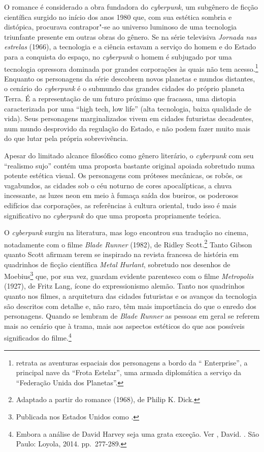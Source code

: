 O romance é considerado a obra fundadora do \emph{cyberpunk}, um
subgênero de ficção científica surgido no início dos anos 1980 que, com
sua estética sombria e distópica, procurava contrapor"-se ao universo
luminoso de uma tecnologia triunfante presente em outras obras do
gênero. Se na série televisiva \emph{Jornada nas estrelas} (1966), a
tecnologia e a ciência estavam a serviço do homem e do Estado para a
conquista do espaço, no \emph{cyberpunk} o homem é subjugado por uma
tecnologia opressora dominada por grandes corporações às quais não tem
acesso.\footnote{{} retrata as aventuras
  espaciais dos personagens a bordo da `` Enterprise'', a principal
  nave da ``Frota Estelar'', uma armada diplomática a serviço da
  ``Federação Unida dos Planetas''.} Enquanto os personagens da série
descobrem novos planetas e mundos distantes, o cenário do
\emph{cyberpunk} é o submundo das grandes cidades do próprio planeta
Terra. É a representação de um futuro próximo que fracassa, uma distopia
caracterizada por uma ``high tech, low life'' (alta tecnologia, baixa
qualidade de vida). Seus personagens marginalizados vivem em cidades
futuristas decadentes, num mundo desprovido da regulação do Estado, e
não podem fazer muito mais do que lutar pela própria sobrevivência.

Apesar do limitado alcance filosófico como gênero literário, o
\emph{cyberpunk} com seu ``realismo sujo'' contém uma proposta bastante
original apoiada sobretudo numa potente estética visual. Os personagens
com próteses mecânicas, os robôs, os vagabundos, as cidades sob o céu
noturno de cores apocalípticas, a chuva incessante, as luzes neon em
meio à fumaça saída dos bueiros, os poderosos edifícios das corporações,
as referências à cultura oriental, tudo isso é mais significativo no
\emph{cyberpunk} do que uma proposta propriamente teórica.

O \emph{cyberpunk} surgiu na literatura, mas logo encontrou sua tradução
no cinema, notadamente com o filme \emph{Blade Runner} (1982), de Ridley
Scott.\footnote{Adaptado a partir do romance {} (1968), de Philip K. Dick.} Tanto Gibson quanto
Scott afirmam terem se inspirado na revista francesa de história em
quadrinhos de ficção científica \emph{Metal Hurlant}, sobretudo nos
desenhos de Moebius\footnote{Publicada nos Estados Unidos como
  {.}} que, por sua vez, guardam evidente parentesco com
o filme \emph{Metropolis} (1927), de Fritz Lang, ícone do expressionismo
alemão. Tanto nos quadrinhos quanto nos filmes, a arquitetura das
cidades futuristas e os avanços da tecnologia são descritos com detalhe
e, não raro, têm mais importância do que o enredo dos personagens.
Quando se lembram de \emph{Blade Runner} as pessoas em geral se referem
mais ao cenário que à trama, mais aos aspectos estéticos do que aos
possíveis significados do filme.\footnote{Embora a análise de David
  Harvey seja uma grata exceção. Ver , David. {}. São Paulo: Loyola,
  2014. pp.~277-289.}

